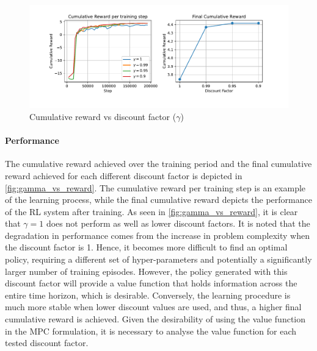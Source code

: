 \begin{figure}[H]
	\centering
	\includegraphics[width = \textwidth]{figures/gamma_reward.pdf}
	\caption{Cumulative reward vs discount factor ($\gamma$)}
	\label{fig:gamma_vs_reward}
\end{figure}

\paragraph{Performance} 
The cumulative reward achieved over the training period and the final cumulative reward achieved for each different discount factor is depicted in \autoref{fig:gamma_vs_reward}. The cumulative reward per training step is an example of the learning process, while the final cumulative reward depicts the performance of the RL system after training. As seen in \autoref{fig:gamma_vs_reward}, it is clear that $\gamma = 1$ does not perform as well as lower discount factors. It is noted that the degradation in performance comes from the increase in problem complexity when the discount factor is 1. Hence, it becomes more difficult to find an optimal policy, requiring a different set of hyper-parameters and potentially a significantly larger number of training episodes. However, the policy generated with this discount factor will provide a value function that holds information across the entire time horizon, which is desirable. Conversely, the learning procedure is much more stable when lower discount values are used, and thus, a higher final cumulative reward is achieved. Given the desirability of using the value function in the MPC formulation, it is necessary to analyse the value function for each tested discount factor.

